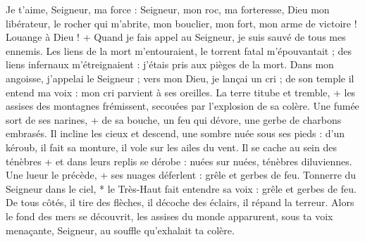 Je t'aime, Seigneur, ma force : Seigneur, mon roc, ma forteresse,
\versseparator
Dieu mon libérateur, le rocher qui m'abrite, mon bouclier, mon fort, mon arme de victoire !
\versseparator
Louange à Dieu ! + Quand je fais appel au Seigneur, je suis sauvé de tous mes ennemis.
\versseparator
Les liens de la mort m'entouraient, le torrent fatal m'épouvantait ;
\versseparator
des liens infernaux m'étreignaient : j'étais pris aux pièges de la mort.
\versseparator
Dans mon angoisse, j'appelai le Seigneur ; vers mon Dieu, je lançai un cri ; de son temple il entend ma voix : mon cri parvient à ses oreilles.
\versseparator
La terre titube et tremble, + les assises des montagnes frémissent, secouées par l'explosion de sa colère.
\versseparator
Une fumée sort de ses narines, + de sa bouche, un feu qui dévore, une gerbe de charbons embrasés.
\versseparator
Il incline les cieux et descend, une sombre nuée sous ses pieds :
\versseparator
d'un kéroub, il fait sa monture, il vole sur les ailes du vent.
\versseparator
Il se cache au sein des ténèbres + et dans leurs replis se dérobe : nuées sur nuées, ténèbres diluviennes.
\versseparator
Une lueur le précède, + ses nuages déferlent : grêle et gerbes de feu.
\versseparator
Tonnerre du Seigneur dans le ciel, * le Très-Haut fait entendre sa voix : grêle et gerbes de feu.
\versseparator
De tous côtés, il tire des flèches, il décoche des éclairs, il répand la terreur.
\versseparator
Alors le fond des mers se découvrit, les assises du monde apparurent, sous ta voix menaçante, Seigneur, au souffle qu'exhalait ta colère.
